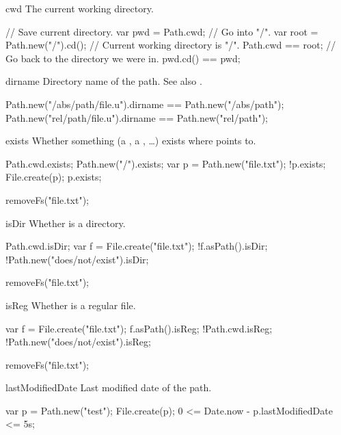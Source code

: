 \begin{urbiscriptapi}
\item[cwd]%
  The current working directory.
\begin{urbiassert}[firstnumber=1]
// Save current directory.
var pwd = Path.cwd;
// Go into "/".
var root = Path.new("/").cd();
// Current working directory is "/".
Path.cwd == root;
// Go back to the directory we were in.
pwd.cd() == pwd;
\end{urbiassert}

\item[dirname]%
  Directory name of the path.  See also .
\begin{urbiassert}
Path.new("/abs/path/file.u").dirname == Path.new("/abs/path");
Path.new("rel/path/file.u").dirname  == Path.new("rel/path");
\end{urbiassert}


\item[exists]%
  Whether something (a , a , \ldots) exists
  where \this points to.
\begin{urbiassert}
Path.cwd.exists;
Path.new("/").exists;
var p = Path.new("file.txt");
!p.exists;
File.create(p);
p.exists;
\end{urbiassert}
\begin{urbicomment}
removeFs("file.txt");
\end{urbicomment}


\item[isDir]%
  Whether \this is a directory.
\begin{urbiassert}
Path.cwd.isDir;
var f = File.create("file.txt");
!f.asPath().isDir;
!Path.new("does/not/exist").isDir;
\end{urbiassert}
\begin{urbicomment}
removeFs("file.txt");
\end{urbicomment}


\item[isReg]%
  Whether \this is a regular file.
\begin{urbiassert}
var f = File.create("file.txt");
 f.asPath().isReg;
!Path.cwd.isReg;
!Path.new("does/not/exist").isReg;
\end{urbiassert}
\begin{urbicomment}
removeFs("file.txt");
\end{urbicomment}


\item[lastModifiedDate]%
  Last modified date of the path.
\begin{urbiassert}
var p = Path.new("test");
File.create(p);
0 <= Date.now - p.lastModifiedDate <= 5s;
\end{urbiassert}



\end{urbiscriptapi}
